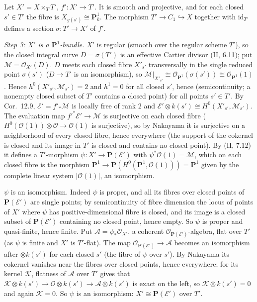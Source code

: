 \documentclass[11pt]{article}
\begin{document}
Let $X'=X\times_TT'$, $f':X'\to T'$. It is smooth and projective, and for each closed $s'\in T'$ the fibre is $X_{g(s')}\cong\mathbf P^1_k$. The morphism $T'\to C_1\hookrightarrow X$ together with $\mathrm{id}_{T'}$ defines a section $\sigma:T'\to X'$ of $f'$.

\emph{Step 3: $X'$ is a $\mathbf P^1$-bundle.} $X'$ is regular (smooth over the regular scheme $T'$), so the closed integral curve $D=\sigma(T')$ is an effective Cartier divisor (II, 6.11); put $\mathcal M=\mathcal O_{X'}(D)$. $D$ meets each closed fibre $X'_{s'}$ transversally in the single reduced point $\sigma(s')$ ($D\to T'$ is an isomorphism), so $\mathcal M|_{X'_{s'}}\cong\mathcal O_{\mathbf P^1}(\sigma(s'))\cong\mathcal O_{\mathbf P^1}(1)$. Hence $h^0(X'_{s'},\mathcal M_{s'})=2$ and $h^1=0$ for all closed $s'$, hence (semicontinuity; a nonempty closed subset of $T'$ contains a closed point) for all points $s'\in T'$. By Cor.~12.9, $\mathcal E'=f'_*\mathcal M$ is locally free of rank $2$ and $\mathcal E'\otimes k(s')\cong H^0(X'_{s'},\mathcal M_{s'})$. The evaluation map $f'^*\mathcal E'\to\mathcal M$ is surjective on each closed fibre ($H^0(\mathcal O(1))\otimes\mathcal O\to\mathcal O(1)$ is surjective), so by Nakayama it is surjective on a neighborhood of every closed fibre, hence everywhere (the support of the cokernel is closed and its image in $T'$ is closed and contains no closed point). By (II, 7.12) it defines a $T'$-morphism $\psi:X'\to\mathbf P(\mathcal E')$ with $\psi^*\mathcal O(1)=\mathcal M$, which on each closed fibre is the morphism $\mathbf P^1\to\mathbf P(H^0(\mathbf P^1,\mathcal O(1)))=\mathbf P^1$ given by the complete linear system $|\mathcal O(1)|$, an isomorphism.

$\psi$ is an isomorphism. Indeed $\psi$ is proper, and all its fibres over closed points of $\mathbf P(\mathcal E')$ are single points; by semicontinuity of fibre dimension the locus of points of $X'$ where $\psi$ has positive-dimensional fibre is closed, and its image is a closed subset of $\mathbf P(\mathcal E')$ containing no closed point, hence empty. So $\psi$ is proper and quasi-finite, hence finite. Put $\mathcal A=\psi_*\mathcal O_{X'}$, a coherent $\mathcal O_{\mathbf P(\mathcal E')}$-algebra, flat over $T'$ (as $\psi$ is finite and $X'$ is $T'$-flat). The map $\mathcal O_{\mathbf P(\mathcal E')}\to\mathcal A$ becomes an isomorphism after $\otimes k(s')$ for each closed $s'$ (the fibre of $\psi$ over $s'$). By Nakayama its cokernel vanishes near the fibres over closed points, hence everywhere; for its kernel $\mathcal K$, flatness of $\mathcal A$ over $T'$ gives that $\mathcal K\otimes k(s')\to\mathcal O\otimes k(s')\to\mathcal A\otimes k(s')$ is exact on the left, so $\mathcal K\otimes k(s')=0$ and again $\mathcal K=0$. So $\psi$ is an isomorphism: $X'\cong\mathbf P(\mathcal E')$ over $T'$.
\end{document}
